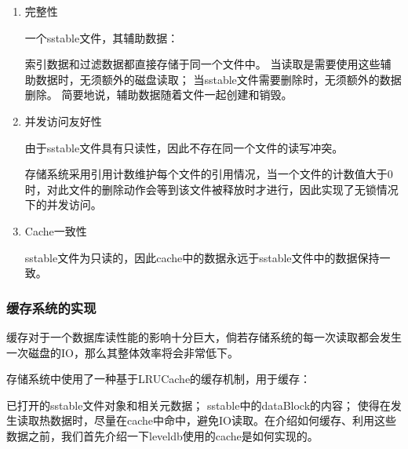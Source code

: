 \begin{enumerate}
\begin{enumerate}
\item 完整性

一个sstable文件，其辅助数据：

索引数据和过滤数据都直接存储于同一个文件中。
当读取是需要使用这些辅助数据时，无须额外的磁盘读取；
当sstable文件需要删除时，无须额外的数据删除。
简要地说，辅助数据随着文件一起创建和销毁。

\item 并发访问友好性

由于sstable文件具有只读性，因此不存在同一个文件的读写冲突。

存储系统采用引用计数维护每个文件的引用情况，当一个文件的计数值大于0时，对此文件的删除动作会等到该文件被释放时才进行，因此实现了无锁情况下的并发访问。

\item Cache一致性

sstable文件为只读的，因此cache中的数据永远于sstable文件中的数据保持一致。
				\end{enumerate}
			\end{enumerate}


		\subsubsection{缓存系统的实现}

		缓存对于一个数据库读性能的影响十分巨大，倘若存储系统的每一次读取都会发生一次磁盘的IO，那么其整体效率将会非常低下。

		存储系统中使用了一种基于LRUCache的缓存机制，用于缓存：
		
		已打开的sstable文件对象和相关元数据；
		sstable中的dataBlock的内容；
		使得在发生读取热数据时，尽量在cache中命中，避免IO读取。在介绍如何缓存、利用这些数据之前，我们首先介绍一下leveldb使用的cache是如何实现的。
		
